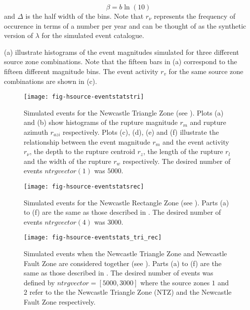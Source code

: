 \begin{enumerate}
\begin{equation}
\beta = b\ln(10)
\end{equation}
\citep{dr_Kramer96a} and $\Delta$ is the half width of the bins.
Note that $r_\nu$ represents the frequency of occurence in terms
of a number per year and can be thought of as the synthetic
version of $\lambda$ for the simulated event catalogue.
\end{enumerate}

(a)
illustrate histograms of the event magnitudes simulated for three
different source zone combinations. Note that the fifteen bars in
(a)
correspond to the fifteen different magnitude bins. The event
activity $r_v$ for the same source zone combinations are shown in
(c).

\begin{figure}
  \vspace{0.8em}
\begin{center}
\texttt{[image: fig-hsource-eventstatstri]}
\end{center}
\caption{Simulated events for the Newcastle Triangle Zone (see
\citealt{dr_Dhu02b}). Plots (a) and (b) show histograms of the
rupture magnitude $r_m$ and rupture azimuth $r_{azi}$
respectively. Plots (c), (d), (e) and (f) illustrate the
relationship between the event magnitude $r_m$ and the event
activity $r_\nu$, the depth to the rupture centroid $r_z$, the
length of the rupture $r_l$ and the width of the rupture $r_w$
respectively. The desired number of events $ntrgvector(1)$ was
$5000$.} \label{fig:source-catalogue-results1}
\end{figure}

\begin{figure}
\begin{center}
\texttt{[image: fig-hsource-eventstatsrec]}
\end{center}
\caption{Simulated events for the Newcastle Rectangle Zone (see
\citealt{dr_Dhu02b}). Parts (a) to (f) are the same as those
described in . The desired
number of events $ntrgvector(4)$ was $3000$.}
\label{fig:source-catalogue-results2}
\end{figure}

\begin{figure}
\begin{center}
\texttt{[image: fig-hsource-eventstats\_tri\_rec]}
\end{center}
 \caption{Simulated
events when the Newcastle Triangle Zone and Newcastle Fault Zone
are considered together (see \citealt{dr_Dhu02b}). Parts (a) to
(f) are the same as those described in
. The desired number of events
was defined by $ntrgvector = [5000,3000]$ where the source zones
$1$ and $2$ refer to the the Newcastle Triangle Zone (NTZ) and the
Newcastle Fault Zone respectively.}
\label{fig:source-catalogue-results3}
\end{figure}



